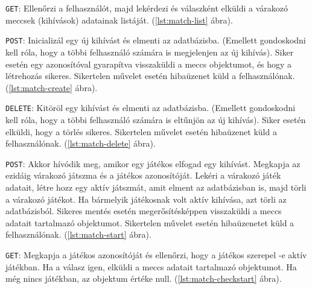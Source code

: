 


\texttt{GET}: Ellenőrzi a felhasználót, majd lekérdezi és válaszként elküldi a várakozó meccsek (kihívások) adatainak listáját. (\ref{lst:match-list} ábra).



\texttt{POST}: Inicializál egy új kihívást és elmenti az adatbázisba. (Emellett gondoskodni kell róla, hogy a többi felhasználó számára is megjelenjen az új kihívás).
Siker esetén egy azonosítóval gyarapítva visszaküldi a meccs objektumot, és hogy a létrehozás sikeres.
Sikertelen művelet esetén hibaüzenet küld a felhasználónak. (\ref{lst:match-create} ábra).



\texttt{DELETE}: Kitöröl egy kihívást és elmenti az adatbázisba. (Emellett gondoskodni kell róla, hogy a többi felhasználó számára is eltűnjön az új kihívás).
Siker esetén elküldi, hogy a törlés sikeres.
Sikertelen művelet esetén hibaüzenet küld a felhasználónak. (\ref{lst:match-delete} ábra).



\texttt{POST}: Akkor hívódik meg, amikor egy játékos elfogad egy kihívást. Megkapja az ezidáig várakozó játszma és a játékos azonosítóját. Lekéri a várakozó játék adatait, létre hozz egy aktív játszmát, amit elment az adatbázisban is, majd törli a várakozó játékot. Ha bármelyik játékosnak volt aktív kihívása, azt törli az adatbázisból.
Sikeres mentés esetén megerősítésképpen visszaküldi a meccs adatait tartalmazó objektumot.
Sikertelen művelet esetén hibaüzenetet küld a felhasználónak. (\ref{lst:match-start} ábra).



\texttt{GET}: Megkapja a játékos azonosítóját és ellenőrzi, hogy a játékos szerepel -e aktív játékban. Ha a válasz igen, elküldi a meccs adatait tartalmazó objektumot. Ha még nincs játékban, az objektum értéke null. (\ref{lst:match-checkstart} ábra).

